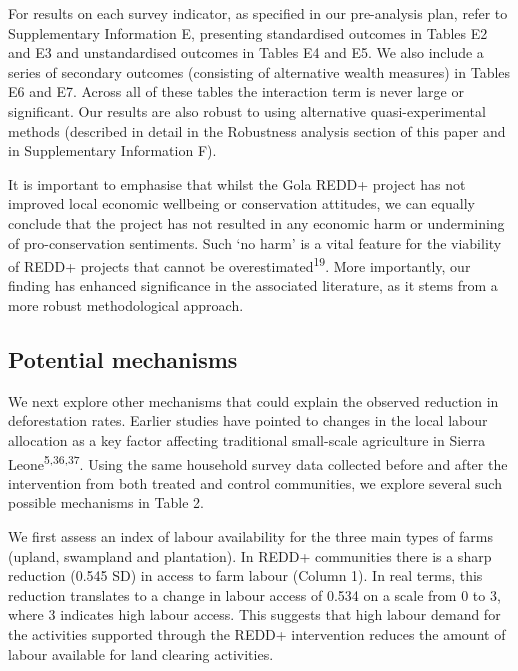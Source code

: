 \documentclass[
]{article}
\begin{document}
For results on each survey indicator, as specified in our pre-analysis
plan, refer to Supplementary Information E, presenting standardised
outcomes in Tables E2 and E3 and unstandardised outcomes in Tables E4
and E5. We also include a series of secondary outcomes (consisting of
alternative wealth measures) in Tables E6 and E7. Across all of these
tables the interaction term is never large or significant. Our results
are also robust to using alternative quasi-experimental methods
(described in detail in the Robustness analysis section of this paper
and in Supplementary Information F).

It is important to emphasise that whilst the Gola REDD+ project has not
improved local economic wellbeing or conservation attitudes, we can
equally conclude that the project has not resulted in any economic harm
or undermining of pro-conservation sentiments. Such `no harm' is a vital
feature for the viability of REDD+ projects that cannot be
overestimated\textsuperscript{19}. More importantly, our finding has
enhanced significance in the associated literature, as it stems from a
more robust methodological approach.

\hypertarget{potential-mechanisms}{%
\subsection{Potential mechanisms}\label{potential-mechanisms}}

We next explore other mechanisms that could explain the observed
reduction in deforestation rates. Earlier studies have pointed to
changes in the local labour allocation as a key factor affecting
traditional small-scale agriculture in Sierra
Leone\textsuperscript{5,36,37}. Using the same household survey data
collected before and after the intervention from both treated and
control communities, we explore several such possible mechanisms in
Table 2.

We first assess an index of labour availability for the three main types
of farms (upland, swampland and plantation). In REDD+ communities there
is a sharp reduction (0.545 SD) in access to farm labour (Column 1). In
real terms, this reduction translates to a change in labour access of
0.534 on a scale from 0 to 3, where 3 indicates high labour access. This
suggests that high labour demand for the activities supported through
the REDD+ intervention reduces the amount of labour available for land
clearing activities.
\end{document}
